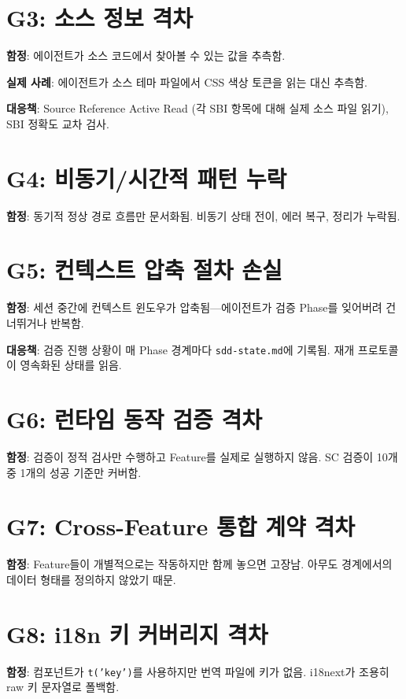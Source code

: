 \documentclass[11pt,a4paper,openright,twoside]{report}
\newcommand{\file}[1]{\texttt{#1}}
\begin{document}
\section{G3: 소스 정보 격차}

\textbf{함정}: 에이전트가 소스 코드에서 찾아볼 수 있는 값을 추측함.

\textbf{실제 사례}: 에이전트가 소스 테마 파일에서 CSS 색상 토큰을 읽는 대신 추측함.

\textbf{대응책}: Source Reference Active Read (각 SBI 항목에 대해 실제 소스 파일 읽기), SBI 정확도 교차 검사.

\section{G4: 비동기/시간적 패턴 누락}

\textbf{함정}: 동기적 정상 경로 흐름만 문서화됨. 비동기 상태 전이, 에러 복구, 정리가 누락됨.

\section{G5: 컨텍스트 압축 절차 손실}

\textbf{함정}: 세션 중간에 컨텍스트 윈도우가 압축됨---에이전트가 검증 Phase를 잊어버려 건너뛰거나 반복함.

\textbf{대응책}: 검증 진행 상황이 매 Phase 경계마다 \file{sdd-state.md}에 기록됨. 재개 프로토콜이 영속화된 상태를 읽음.

\section{G6: 런타임 동작 검증 격차}

\textbf{함정}: 검증이 정적 검사만 수행하고 Feature를 실제로 실행하지 않음. SC 검증이 10개 중 1개의 성공 기준만 커버함.

\section{G7: Cross-Feature 통합 계약 격차}

\textbf{함정}: Feature들이 개별적으로는 작동하지만 함께 놓으면 고장남. 아무도 경계에서의 데이터 형태를 정의하지 않았기 때문.

\section{G8: i18n 키 커버리지 격차}

\textbf{함정}: 컴포넌트가 \texttt{t('key')}를 사용하지만 번역 파일에 키가 없음. i18next가 조용히 raw 키 문자열로 폴백함.
\end{document}

